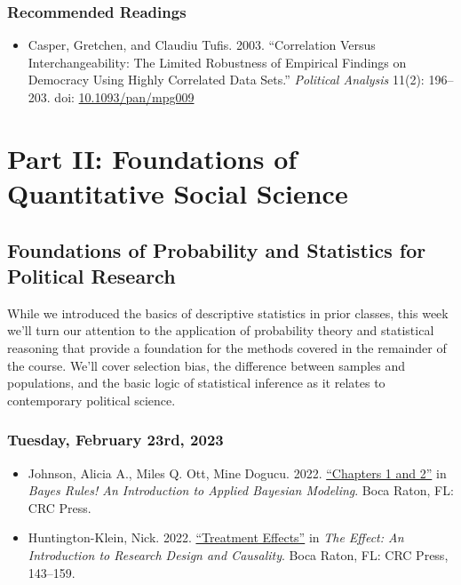 \documentclass[12pt,]{article}
\providecommand{\tightlist}{%
  \setlength{\itemsep}{0pt}\setlength{\parskip}{0pt}}
\begin{document}
\hypertarget{recommended-readings-3}{%
\subsubsection{Recommended Readings}\label{recommended-readings-3}}

\begin{itemize}
\tightlist
\item
  Casper, Gretchen, and Claudiu Tufis. 2003. ``Correlation Versus
  Interchangeability: The Limited Robustness of Empirical Findings on
  Democracy Using Highly Correlated Data Sets.'' \emph{Political
  Analysis} 11(2): 196--203. doi:
  \href{https://doi.org/10.1093/pan/mpg009}{10.1093/pan/mpg009}
\end{itemize}

\hypertarget{part-ii-foundations-of-quantitative-social-science}{%
\section{Part II: Foundations of Quantitative Social
Science}\label{part-ii-foundations-of-quantitative-social-science}}

\hypertarget{foundations-of-probability-and-statistics-for-political-research}{%
\subsection{Foundations of Probability and Statistics for Political
Research}\label{foundations-of-probability-and-statistics-for-political-research}}

\noindent While we introduced the basics of descriptive statistics in
prior classes, this week we'll turn our attention to the application of
probability theory and statistical reasoning that provide a foundation
for the methods covered in the remainder of the course. We'll cover
selection bias, the difference between samples and populations, and the
basic logic of statistical inference as it relates to contemporary
political science.

\hypertarget{tuesday-february-23rd-2023}{%
\subsubsection{Tuesday, February 23rd,
2023}\label{tuesday-february-23rd-2023}}

\begin{itemize}
\item
  Johnson, Alicia A., Miles Q. Ott, Mine Dogucu. 2022.
  \href{https://www.bayesrulesbook.com/chapter-1.html}{``Chapters 1 and
  2''} in \emph{Bayes Rules! An Introduction to Applied Bayesian
  Modeling}. Boca Raton, FL: CRC Press.
\item
  Huntington-Klein, Nick. 2022.
  \href{https://theeffectbook.net/ch-TreatmentEffects.html}{``Treatment
  Effects''} in \emph{The Effect: An Introduction to Research Design and
  Causality}. Boca Raton, FL: CRC Press, 143--159.
\end{itemize}
\end{document}
